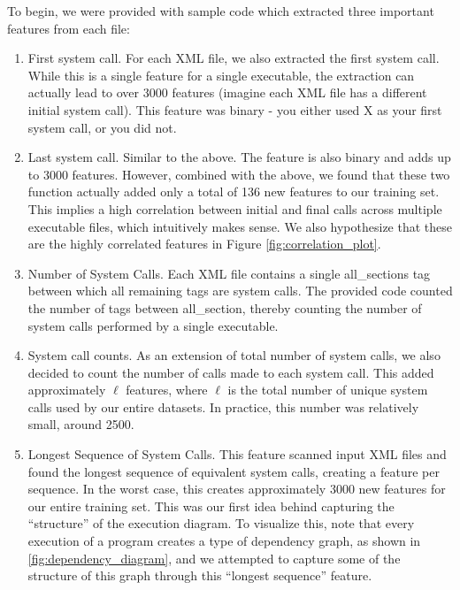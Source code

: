\documentclass[letterpaper]{article}
\begin{document}
\noindent To begin, we were provided with sample code which extracted three important features from each file:
\begin{enumerate}
\item First system call. For each XML file, we also extracted the first system call. While this is a single feature for a single executable, the extraction can actually lead to over 3000 features (imagine each XML file has a different initial system call). This feature was binary - you either used X as your first system call, or you did not.

\item Last system call. Similar to the above. The feature is also binary and adds up to 3000 features. However, combined with the above, we found that these two function actually added only a total of 136 new features to our training set. This implies a high correlation between initial and final calls across multiple executable files, which intuitively makes sense. We also hypothesize that these are the highly correlated features in Figure \ref{fig:correlation_plot}.

\item Number of System Calls. Each XML file contains a single all\_sections tag between which all remaining tags are system calls. The provided code counted the number of tags between all\_section, thereby counting the number of system calls performed by a single executable.

\item System call counts. As an extension of total number of system calls, we also decided to count the number of calls made to each system call. This added approximately $\ell$ features, where $\ell$ is the total number of unique system calls used by our entire datasets. In practice, this number was relatively small, around 2500. 

\item Longest Sequence of System Calls. This feature scanned input XML files and found the longest sequence of equivalent system calls, creating a feature per sequence. In the worst case, this creates approximately 3000 new features for our entire training set. This was our first idea behind capturing the ``structure'' of the execution diagram. To visualize this, note that every execution of a program creates a type of dependency graph, as shown in \ref{fig:dependency_diagram}, and we attempted to capture some of the structure of this graph through this ``longest sequence'' feature.


\end{enumerate}
\end{document}

